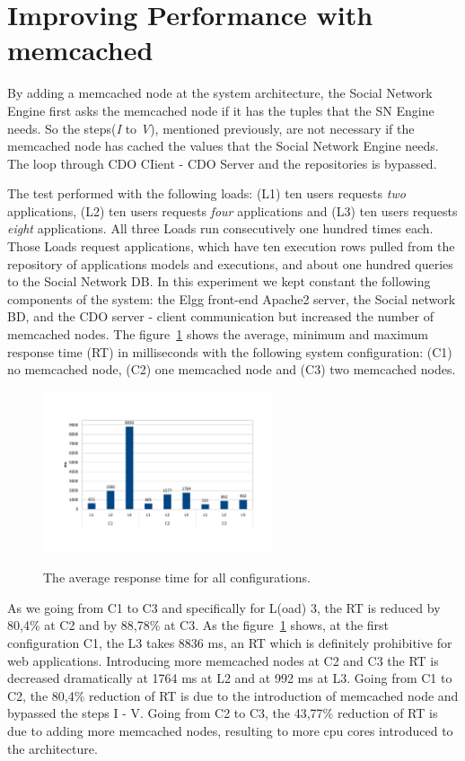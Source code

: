 \section{Improving Performance with memcached}
\label{sec:eval_memcache}
By adding a memcached node at the system architecture, the Social Network Engine first asks the memcached node if it has the tuples that the SN Engine needs. So the steps(\emph{I} to \emph{V}), mentioned previously, are not necessary if the memcached node has cached the values that the Social Network Engine needs. The loop through CDO CIient - CDO Server and the repositories is bypassed. 

The test performed with the following loads: (L1) ten users requests \emph{two} applications, (L2) ten users requests \emph{four} applications and (L3) ten users requests \emph{eight} applications. All three Loads run consecutively one hundred times each. Those Loads request applications, which have ten execution rows pulled from the repository of applications models and executions, and about one hundred queries to the Social Network DB. In this experiment we kept constant the following components of the system: the Elgg front-end Apache2 server, the Social network BD, and the CDO server - client communication but increased the number of memcached nodes.
The figure~\ref{fig:rtavg} shows the  average, minimum and maximum response time (RT) in milliseconds with the following system configuration: (C1) no memcached node, (C2) one memcached node and (C3) two memcached nodes.

\begin{figure}[h]
	\caption{The average response time for all configurations.}
	\includegraphics[width=0.6\textwidth,natwidth=200,natheight=150]{./fig/RTavg.pdf}
	\centering
	\label{fig:rtavg}
\end{figure}

As we going from C1 to C3 and specifically for L(oad) 3, the RT is reduced by 80,4\% at C2 and by 88,78\% at C3. As the figure~\ref{fig:rtavg} shows, at the first configuration C1, the L3 takes 8836 ms, an RT which is definitely prohibitive for web applications. Introducing more memcached nodes at C2 and C3 the RT is decreased dramatically at 1764 ms at L2 and at 992 ms at L3. Going from C1 to C2, the 80,4\% reduction of RT is due to the introduction of memcached node and bypassed the steps I - V. Going from C2 to C3, the 43,77\% reduction of RT is due to adding more memcached nodes, resulting to more cpu cores  introduced to the architecture.

